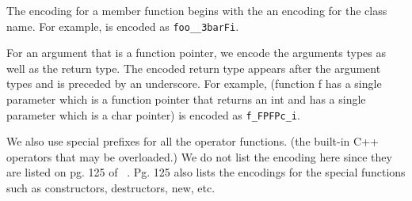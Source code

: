 The encoding for a member function begins with the an encoding
for the class name.  For example,  is 
encoded as \texttt{foo\_\_3barFi}.

For an argument that is a function pointer, we encode the arguments
types as well as the return type.  The encoded return type appears
after the argument types and is preceded by an underscore.  For
example,  (\ie function f has a single
parameter which is a function pointer that returns an int
and has a single parameter which is a char pointer) is encoded
as \texttt{f\_FPFPc\_i}.

We also use special prefixes for all the operator functions.  (\eg the
built-in C++ operators that may be overloaded.)  We do not list the
encoding here since they are listed on pg. 125 of ~\cite{ellis:90}.
Pg. 125 also lists the encodings for the special functions such as
constructors, destructors, new, etc.
